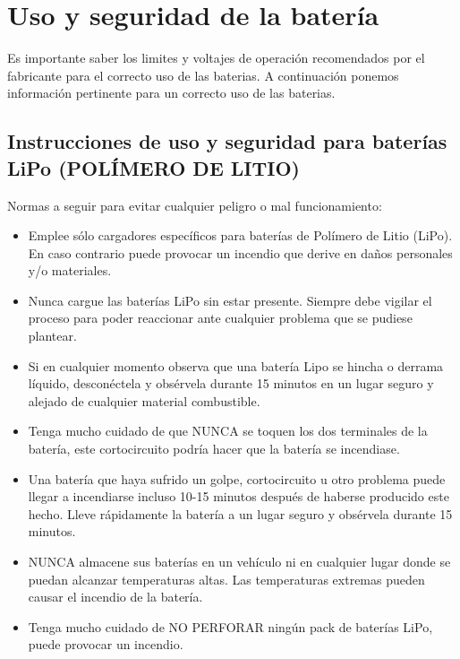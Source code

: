 \documentclass[user_manual.tex]{subfiles}
\begin{document}
\section{Uso y seguridad de la batería}

Es importante saber los limites y voltajes de operación recomendados por el fabricante para el correcto uso de las baterias. 
A continuación ponemos información pertinente para un correcto uso de las baterias.
\subsection{Instrucciones de uso y seguridad para baterías LiPo (POLÍMERO DE LITIO)}
Normas a seguir para evitar cualquier peligro o mal funcionamiento:

\begin{itemize}

    \item Emplee sólo cargadores específicos para baterías de Polímero de Litio (LiPo). En caso contrario puede provocar un 
    incendio que derive en daños personales y/o materiales.
    \item Nunca cargue las baterías LiPo sin estar presente. Siempre debe vigilar el proceso para poder reaccionar ante cualquier
    problema que se pudiese plantear.
    \item Si en cualquier momento observa que una batería Lipo se hincha o derrama líquido, desconéctela y obsérvela durante 15
    minutos en un lugar seguro y alejado de cualquier material combustible.
    \item Tenga mucho cuidado de que NUNCA se toquen los dos terminales de la batería, este cortocircuito podría hacer que la 
    batería se incendiase.
    \item Una batería que haya sufrido un golpe, cortocircuito u otro problema puede llegar a incendiarse incluso 10-15 minutos 
    después de haberse producido este hecho. Lleve rápidamente la batería a un lugar seguro y obsérvela durante 15 minutos.
    \item NUNCA almacene sus baterías en un vehículo ni en cualquier lugar donde se puedan alcanzar temperaturas altas. Las 
    temperaturas extremas pueden causar el incendio de la batería.
    \item Tenga mucho cuidado de NO PERFORAR ningún pack de baterías LiPo, puede provocar un incendio.
    \end{itemize}
    
\end{document}
